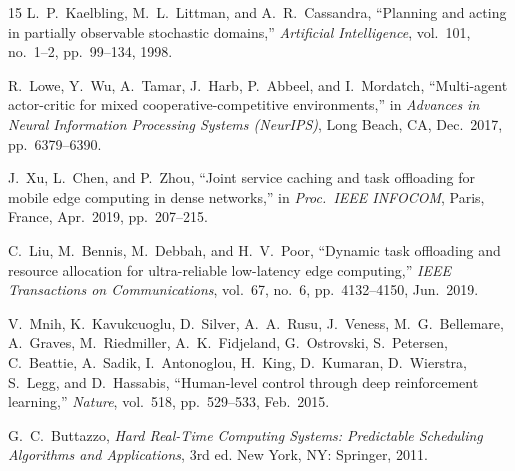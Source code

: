 \documentclass[conference]{IEEEtran}
\begin{document}
\begin{thebibliography}{15}
L.~P.~Kaelbling, M.~L.~Littman, and A.~R.~Cassandra,
``Planning and acting in partially observable stochastic domains,''
\emph{Artificial Intelligence}, vol.~101, no.~1--2, pp.~99--134, 1998.

R.~Lowe, Y.~Wu, A.~Tamar, J.~Harb, P.~Abbeel, and I.~Mordatch,
``Multi-agent actor-critic for mixed cooperative-competitive
environments,''
in \emph{Advances in Neural Information Processing Systems (NeurIPS)},
Long Beach, CA, Dec.\ 2017, pp.~6379--6390.

J.~Xu, L.~Chen, and P.~Zhou,
``Joint service caching and task offloading for mobile edge computing
in dense networks,''
in \emph{Proc.\ IEEE INFOCOM}, Paris, France, Apr.\ 2019, pp.~207--215.

C.~Liu, M.~Bennis, M.~Debbah, and H.~V.~Poor,
``Dynamic task offloading and resource allocation for ultra-reliable
low-latency edge computing,''
\emph{IEEE Transactions on Communications}, vol.~67, no.~6,
pp.~4132--4150, Jun.\ 2019.

V.~Mnih, K.~Kavukcuoglu, D.~Silver, A.~A.~Rusu, J.~Veness,
M.~G.~Bellemare, A.~Graves, M.~Riedmiller, A.~K.~Fidjeland,
G.~Ostrovski, S.~Petersen, C.~Beattie, A.~Sadik, I.~Antonoglou,
H.~King, D.~Kumaran, D.~Wierstra, S.~Legg, and D.~Hassabis,
``Human-level control through deep reinforcement learning,''
\emph{Nature}, vol.~518, pp.~529--533, Feb.\ 2015.

G.~C.~Buttazzo,
\emph{Hard Real-Time Computing Systems: Predictable Scheduling
Algorithms and Applications}, 3rd ed.
New York, NY: Springer, 2011.

\end{thebibliography}
\end{document}

